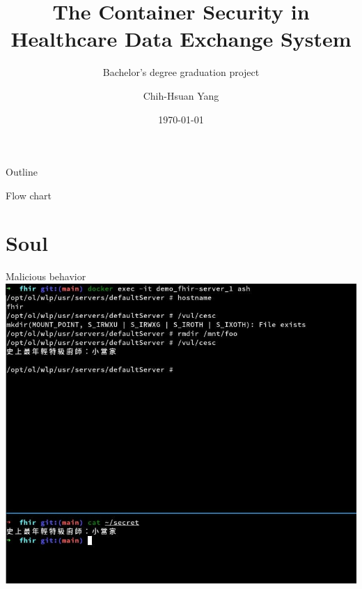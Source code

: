 \documentclass{beamer}
\title{The Container Security in Healthcare Data Exchange System}
\subtitle{Bachelor's degree graduation project}
\author{Chih-Hsuan Yang}
\institute{National Sun Yat-sen University\\
Advisor: Chun-I Fan
}
\date{\today}
\begin{document}
\begin{CJK*}{UTF8}{bsmi}

  \begin{frame}
    \titlepage
  \end{frame}


  \begin{frame}{Outline}
    \begin{multicols}{2}
      \tableofcontents
    \end{multicols}
  \end{frame}

  \begin{frame}{Flow chart}
    \centering
    \scalebox{0.9} {
    }
  \end{frame}

  \section{Soul}
  \begin{frame}{Malicious behavior}
    \centering
    \includegraphics[height=\textheight]{photo_2021-09-17_05-53-42.jpg}
  \end{frame}


\end{CJK*}
\end{document}
